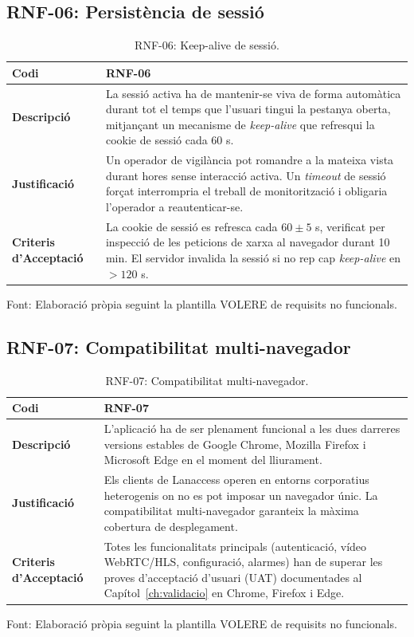 \subsection{RNF-06: Persistència de sessió}
\begin{table}[htbp]
  \centering
  \small
  \begin{tabular}{|l|p{10cm}|}
    \hline
    \textbf{Codi}                    & RNF-06 \\ \hline
    \textbf{Descripció}              & La sessió activa ha de mantenir-se viva de forma automàtica durant tot el temps que l'usuari tingui la pestanya oberta, mitjançant un mecanisme de \textit{keep-alive} que refresqui la cookie de sessió cada 60 s. \\ \hline
    \textbf{Justificació}            & Un operador de vigilància pot romandre a la mateixa vista durant hores sense interacció activa. Un \textit{timeout} de sessió forçat interrompria el treball de monitorització i obligaria l'operador a reautenticar-se. \\ \hline
    \textbf{Criteris d'Acceptació}   & La cookie de sessió es refresca cada $60 \pm 5$ s, verificat per inspecció de les peticions de xarxa al navegador durant 10 min. El servidor invalida la sessió si no rep cap \textit{keep-alive} en $>120$ s. \\ \hline
  \end{tabular}
  \caption{RNF-06: Keep-alive de sessió.}
  \label{tab:rnf06}
\par\smallskip
\small Font: Elaboració pròpia seguint la plantilla VOLERE de requisits no funcionals.
\end{table}

\clearpage
\subsection{RNF-07: Compatibilitat multi-navegador}
\begin{table}[htbp]
  \centering
  \small
  \begin{tabular}{|l|p{10cm}|}
    \hline
    \textbf{Codi}                    & RNF-07 \\ \hline
    \textbf{Descripció}              & L'aplicació ha de ser plenament funcional a les dues darreres versions estables de Google Chrome, Mozilla Firefox i Microsoft Edge en el moment del lliurament. \\ \hline
    \textbf{Justificació}            & Els clients de Lanaccess operen en entorns corporatius heterogenis on no es pot imposar un navegador únic. La compatibilitat multi-navegador garanteix la màxima cobertura de desplegament. \\ \hline
    \textbf{Criteris d'Acceptació}   & Totes les funcionalitats principals (autenticació, vídeo WebRTC/HLS, configuració, alarmes) han de superar les proves d'acceptació d'usuari (UAT) documentades al Capítol~\ref{ch:validacio} en Chrome, Firefox i Edge. \\ \hline
  \end{tabular}
  \caption{RNF-07: Compatibilitat multi-navegador.}
  \label{tab:rnf07}
\par\smallskip
\small Font: Elaboració pròpia seguint la plantilla VOLERE de requisits no funcionals.
\end{table}

